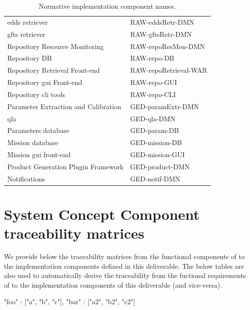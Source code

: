 \documentclass[9pt,twoside,openright,a4paper,pagesize]{report}
\newenvironment{func2ImplComp} %
{
}
{
}
\begin{document}
\begin{table}
\begin{tabular}{ l | l }
  \hline\hline
  \gls{edds} retriever & RAW-eddsRetr-DMN \\
  \gls{gfts} retriever & RAW-gftsRetr-DMN \\
  Repository Resource Monitoring & RAW-repoResMon-DMN \\
  Repository DB & RAW-repo-DB \\
  Repository Retrieval Front-end & RAW-repoRetrieval-WAR \\
  Repository \gls{gui} Front-end & RAW-repo-GUI \\
  Repository \gls{cli} tools & RAW-repo-CLI \\
  Parameter Extraction and Calibration & GED-paramExtr-DMN \\
  \gls{qla} & GED-qla-DMN \\
  Parameters database & GED-param-DB \\
  Mission database & GED-mission-DB \\
  Mission \gls{gui} front-end & GED-mission-GUI \\
  Product Generation Plugin Framework & GED-product-DMN \\
  Notifications & GED-notif-DMN \\
  \hline\hline
\end{tabular}
\caption{Normative implementation component names.}
\label{tbl:compo-names}
\end{table}

\section{System Concept Component traceability matrices}
We provide below the traceability matrices from the functional components
of \cite{ref:sow} to the implementation components defined in this deliverable.
The below tables are also used to automatically derive the traceability from the fuctional requirements
of \cite{ref:sow} to the implementation components of this deliverable (and vice-versa).

\begin{func2ImplComp}
  {
      "foo" : ["a", "b", "c"],
      "bar" : ["a2", "b2", "c2"]
  }
\end{func2ImplComp}
\end{document}
